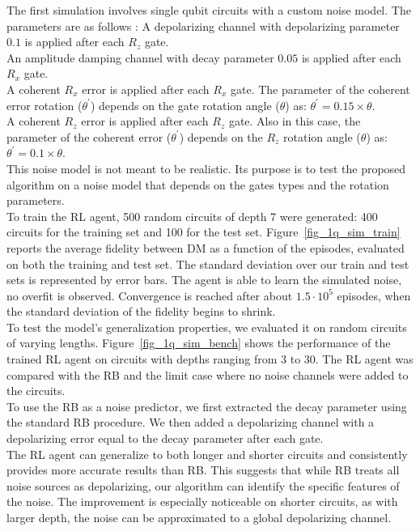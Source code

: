 \documentclass[referee,sn-basic]{sn-jnl} %
\begin{document}
The first simulation involves single qubit circuits with a custom noise model. The parameters are as follows :
A depolarizing channel with depolarizing parameter $0.1$ is applied after each $R_z$ gate.\\
An amplitude damping channel with decay parameter $0.05$ is applied after each $R_x$ gate.\\
A coherent $R_x$ error is applied after each $R_x$ gate. The parameter of the coherent error rotation 
($\theta^{'}$) depends on the gate rotation angle ($\theta$) as: $\theta^{'}=0.15\times\theta$.\\
A coherent $R_z$ error is applied after each $R_z$ gate. Also in this case, the parameter of the coherent 
error ($\theta^{'}$) depends on the $R_z$ rotation angle ($\theta$) as: $\theta^{'}=0.1\times\theta$.\\
This noise model is not meant to be realistic. Its purpose is to test the proposed algorithm on a noise model 
that depends on the gates types and the rotation parameters.\\
To train the RL agent, 500 random circuits of depth 7 were generated: 400 circuits for the training set and 
100 for the test set. Figure~\ref{fig_1q_sim_train} reports the average fidelity between DM as a function of 
the episodes, evaluated on both the training and test set. The standard deviation over our train and test sets 
is represented by error bars. The agent is able to learn the simulated noise, no overfit is observed. 
Convergence is reached after about $1.5\cdot10^5$ episodes, when the standard deviation of the fidelity begins 
to shrink.\\

\noindent
To test the model's generalization properties, we evaluated it on random circuits of varying lengths. 
Figure~\ref{fig_1q_sim_bench} shows the performance of the trained RL agent on circuits with depths ranging from 3 to 30. 
The RL agent was compared with the RB and the limit case where no noise channels were added to the circuits.\\
To use the RB as a noise predictor, we first extracted the decay parameter using the standard RB procedure. 
We then added a depolarizing channel with a depolarizing error equal to the decay parameter after each gate.\\
The RL agent can generalize to both longer and shorter circuits and consistently provides more accurate results than RB. 
This suggests that while RB treats all noise sources as depolarizing, our algorithm can identify the specific features of the noise. 
The improvement is especially noticeable on shorter circuits, as with larger depth, the noise can be approximated to a global depolarizing channel.\\
\end{document}
